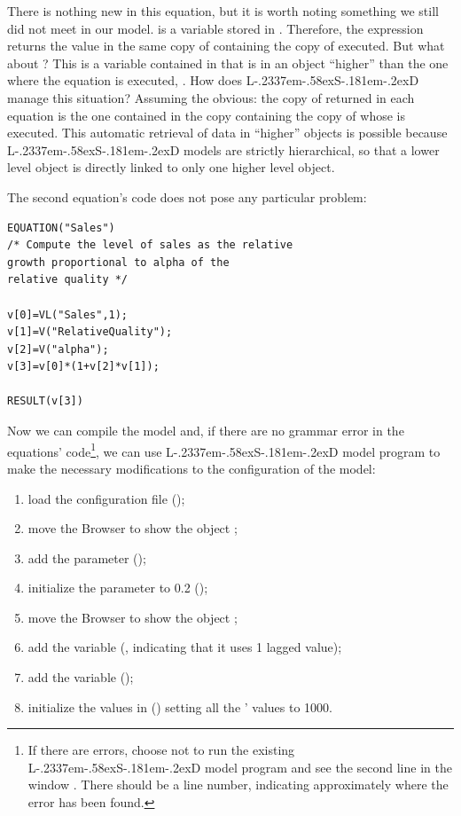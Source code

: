 \documentclass [11pt,a4paper] {book}
\def\LsD{{L\kern-.2337em\lower-.58ex\hbox{S}\kern-.181em\lower-.2ex\hbox{D}}\xspace}
\begin{document}
There is nothing new in this equation, but it is worth noting something we still
did not meet in our model.  is a variable stored in .
Therefore, the  expression returns the value in the same copy of
 containing the copy of  executed. But what about
? This is a variable contained in 
that is in an object ``higher'' than the one where the equation is executed, .
How does \LsD manage this situation? Assuming the obvious: the copy of 
returned in each equation is the one contained in the  copy
containing the copy of  whose  is executed. This
automatic retrieval of data in ``higher'' objects is possible because \LsD models are
strictly hierarchical, so that a lower level object is directly linked to only one higher
level object.

The second equation's code does not pose any particular problem:

\small
\begin{verbatim}
EQUATION("Sales")
/* Compute the level of sales as the relative
growth proportional to alpha of the
relative quality */

v[0]=VL("Sales",1);
v[1]=V("RelativeQuality");
v[2]=V("alpha");
v[3]=v[0]*(1+v[2]*v[1]);

RESULT(v[3])
\end{verbatim}
\normalsize

Now we can compile the model and, if there are no grammar error in the equations'
code\footnote{If there are errors, choose not to run the existing \LsD model program and
see the second line in the window . There should be a line number, indicating
approximately where the error has been found.}, we can use \LsD model program to make the necessary modifications to the configuration of the model:


\begin{enumerate}

\item load the configuration file ();
\item move the Browser to show the object ;
\item add the parameter  ();
\item initialize the parameter to 0.2 ();
\item move the Browser to show the object ;
\item add the variable  (, indicating
that it uses 1 lagged value);
\item add the variable  ();
\item initialize the values in  () setting all
the ' values to 1000.
\end{enumerate}
\end{document}
